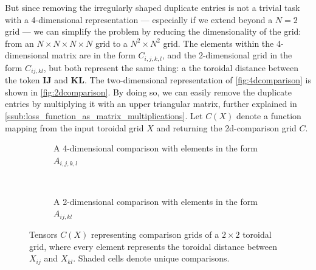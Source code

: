 But since removing the irregularly shaped duplicate entries is not a trivial task with a 4-dimensional representation --- especially if we extend beyond a $N=2$ grid --- we can simplify the problem by reducing the dimensionality of the grid: from an $N\times N\times N\times N$ grid to a $N^2\times N^2$ grid. The elements within the 4-dimensional matrix are in the form $C_{i,j,k,l}$, and the 2-dimensional grid in the form $C_{ij,kl}$, but both represent the same thing: a the toroidal distance between the token $\bm{IJ}$ and $\bm{KL}$. The two-dimensional representation of \autoref{fig:4dcomparison} is shown in \autoref{fig:2dcomparison}. By doing so, we can easily remove the duplicate entries by multiplying it with an upper triangular matrix, further explained in \autoref{ssub:loss_function_as_matrix_multiplications}. Let $C(X)$ denote a function mapping from the input toroidal grid $X$ and returning the 2d-comparison grid $C$.
\begin{figure}[htpb]
    \centering
    \begin{subfigure}[t]{0.5\textwidth}
    \begin{center}
    \end{center}
    \caption{A 4-dimensional comparison with elements in the form $A_{i,j,k,l}$}
    \label{fig:4dcomparison}
    \end{subfigure}%
    ~
    \begin{subfigure}[t]{0.5\textwidth}
    \begin{center}
    \end{center}
    \caption{A 2-dimensional comparison with elements in the form $A_{ij,kl}$}
    \label{fig:2dcomparison}
    \end{subfigure}

    \caption{Tensors $C(X)$ representing comparison grids of a $2\times 2$ toroidal grid, where every element represents the toroidal distance between $X_{ij}$ and $X_{kl}$. Shaded cells denote unique comparisons.}%
    \label{fig:comparisonGrids}
\end{figure}

